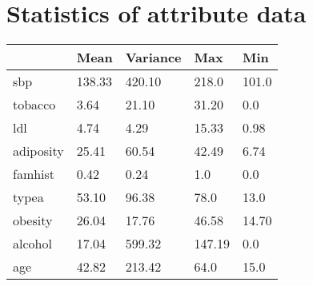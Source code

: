\section{Statistics of attribute data}

\begin{tabular}{| l | l | l | l | l |}
\hline
 & Mean & Variance & Max & Min \\ \hline
sbp	& 138.33 & 420.10 & 218.0 & 101.0 \\ \hline
tobacco	& 3.64 & 21.10 & 31.20 & 0.0 \\ \hline
ldl	&  4.74 & 4.29 & 15.33 & 0.98 \\ \hline
adiposity & 25.41 & 60.54 & 42.49 & 6.74 \\ \hline
famhist & 0.42 & 0.24 & 1.0 & 0.0 \\ \hline
typea	& 53.10 & 96.38 & 78.0 & 13.0 \\ \hline
obesity & 26.04 & 17.76 & 46.58 & 14.70 \\ \hline
alcohol	& 17.04 & 599.32 & 147.19 & 0.0 \\ \hline
age	& 42.82 & 213.42 & 64.0 & 15.0 \\ \hline
\end{tabular}
